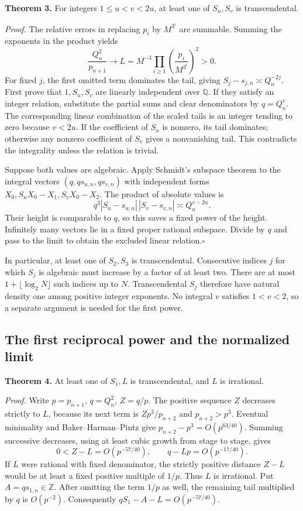 \documentclass[11pt,a4paper,oneside,openany]{book}
\begin{document}
\textbf{Theorem 3.} For integers $1\le u<v<2u$, at least one of $S_u,S_v$ is transcendental.

\textit{Proof.} The relative errors in replacing $p_i$ by $M^{3^i}$ are summable. Summing the exponents in the product yields
\[
  \frac{Q_n^2}{p_{n+1}}\longrightarrow
  L=M^{-3}\prod_{i\ge1}\left(\frac{p_i}{M^{3^i}}\right)^2>0.
\]
For fixed $j$, the first omitted term dominates the tail, giving $S_j-s_{j,n}\asymp Q_n^{-2j}$. First prove that $1,S_u,S_v$ are linearly independent over $\mathbb Q$. If they satisfy an integer relation, substitute the partial sums and clear denominators by $q=Q_n^v$. The corresponding linear combination of the scaled tails is an integer tending to zero because $v<2u$. If the coefficient of $S_u$ is nonzero, its tail dominates; otherwise any nonzero coefficient of $S_v$ gives a nonvanishing tail. This contradicts the integrality unless the relation is trivial.

Suppose both values are algebraic. Apply Schmidt's subspace theorem to the integral vectors $(q,qs_{u,n},qs_{v,n})$ with independent forms $X_0,S_uX_0-X_1,S_vX_0-X_2$. The product of absolute values is
\[
 q^3|S_u-s_{u,n}|\,|S_v-s_{v,n}|\asymp Q_n^{v-2u}.
\]
Their height is comparable to $q$, so this saves a fixed power of the height. Infinitely many vectors lie in a fixed proper rational subspace. Divide by $q$ and pass to the limit to obtain the excluded linear relation.\hfill$\square$

In particular, at least one of $S_2,S_3$ is transcendental. Consecutive indices $j$ for which $S_j$ is algebraic must increase by a factor of at least two. There are at most $1+\lfloor\log_2 N\rfloor$ such indices up to $N$. Transcendental $S_j$ therefore have natural density one among positive integer exponents. No integral $v$ satisfies $1<v<2$, so a separate argument is needed for the first power.

\subsection*{The first reciprocal power and the normalized limit}
\textbf{Theorem 4.} At least one of $S_1,L$ is transcendental, and $L$ is irrational.

\textit{Proof.} Write $p=p_{n+1}$, $q=Q_n^2$, $Z=q/p$. The positive sequence $Z$ decreases strictly to $L$, because its next term is $Zp^3/p_{n+2}$ and $p_{n+2}>p^3$. Eventual minimality and Baker--Harman--Pintz give $p_{n+2}-p^3=O(p^{63/40})$. Summing successive decreases, using at least cubic growth from stage to stage, gives
\[
 0<Z-L=O(p^{-57/40}),\qquad q-Lp=O(p^{-17/40}).
\]
If $L$ were rational with fixed denominator, the strictly positive distance $Z-L$ would be at least a fixed positive multiple of $1/p$. Thus $L$ is irrational. Put $A=qs_{1,n}\in\mathbb Z$. After omitting the term $1/p$ as well, the remaining tail multiplied by $q$ is $O(p^{-2})$. Consequently $qS_1-A-L=O(p^{-57/40})$.
\end{document}

